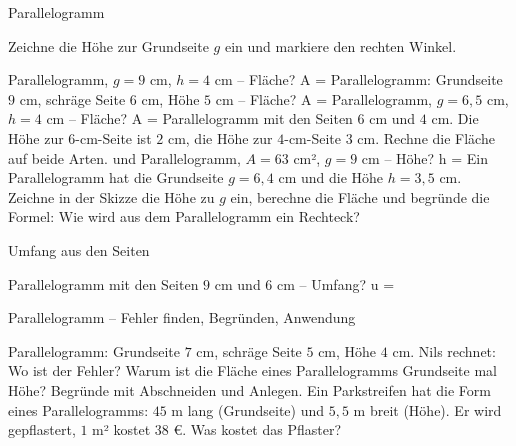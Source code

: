 \setcounter{aufgabe}{14}

\begin{aufgabe}{Parallelogramm}
\begin{teile}
\teil Zeichne die Höhe zur Grundseite $g$ ein und markiere den rechten Winkel.

\teil Parallelogramm, $g = 9$ cm, $h = 4$ cm – Fläche? A = \leerfeld[cm²]
\teil Parallelogramm: Grundseite $9$ cm, schräge Seite $6$ cm, Höhe $5$ cm – Fläche? A = \leerfeld[cm²]
\teil Parallelogramm, $g = 6{,}5$ cm, $h = 4$ cm – Fläche? A = \leerfeld[cm²]
\teil Parallelogramm mit den Seiten $6$ cm und $4$ cm. Die Höhe zur $6$-cm-Seite ist $2$ cm, die Höhe zur $4$-cm-Seite $3$ cm. Rechne die Fläche auf beide Arten. \leerfeld[cm²] und \leerfeld[cm²]
\teil Parallelogramm, $A = 63$ cm², $g = 9$ cm – Höhe? h = \leerfeld[cm]
\teil Ein Parallelogramm hat die Grundseite $g = 6{,}4$ cm und die Höhe $h = 3{,}5$ cm. Zeichne in der Skizze die Höhe zu $g$ ein, berechne die Fläche und begründe die Formel: Wie wird aus dem Parallelogramm ein Rechteck?

\end{teile}
\end{aufgabe}

\begin{aufgabe}{Umfang aus den Seiten}
\begin{teile}
\teil Parallelogramm mit den Seiten $9$ cm und $6$ cm – Umfang? u = \leerfeld[cm]
\end{teile}
\end{aufgabe}

\begin{aufgabe}{Parallelogramm – Fehler finden, Begründen, Anwendung}
\begin{teile}
\teil Parallelogramm: Grundseite $7$ cm, schräge Seite $5$ cm, Höhe $4$ cm. Nils rechnet:  Wo ist der Fehler?
\teil Warum ist die Fläche eines Parallelogramms Grundseite mal Höhe? Begründe mit Abschneiden und Anlegen.
\teil Ein Parkstreifen hat die Form eines Parallelogramms: $45$ m lang (Grundseite) und $5{,}5$ m breit (Höhe). Er wird gepflastert, $1$ m² kostet $38$ €. Was kostet das Pflaster?
\end{teile}
\end{aufgabe}
